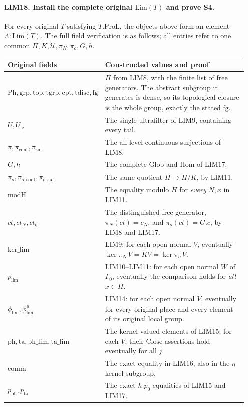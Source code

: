 \paragraph{LIM18. Install the complete original \(\mathrm{Lim}(T)\) and prove S4.}
\label{claim:LIM18}
For every original \(T\) satisfying \(T.\mathrm{ProL}\), the
objects above form an element \(\Lambda:\mathrm{Lim}(T)\).
The full field verification is as follows; all entries refer to
one common \(\Pi,K,\mathcal U,\pi_N,\pi_o,G,h\).

\begin{longtable}{@{}p{0.34\linewidth}p{0.61\linewidth}@{}}
\toprule
Original fields & Constructed values and proof \\
\midrule
\endhead
\(\mathrm{Ph},\mathrm{grp},\mathrm{top},\mathrm{tgrp},
  \mathrm{cpt},\mathrm{tdisc},\mathrm{fg}\)
& \(\Pi\) from LIM8, with the finite list of free generators.
  The abstract subgroup it generates is dense, so its topological
  closure is the whole group, exactly the stated \(\mathrm{fg}\). \\
\(U,U_{\mathrm{le}}\)
& The single ultrafilter of LIM9, containing every tail. \\
\(\pi,\pi_{\mathrm{cont}},\pi_{\mathrm{surj}}\)
& The all-level continuous surjections of LIM8. \\
\(G,h\)
& The complete \(\mathrm{Glob}\) and \(\mathrm{Hom}\) of LIM17. \\
\(\pi_o,\pi_{o,\mathrm{cont}},\pi_{o,\mathrm{surj}}\)
& The same quotient \(\Pi\to\Pi/K\), by LIM11. \\
\(\mathrm{modH}\)
& The equality modulo \(H\) for \emph{every} \(N,x\) in LIM11. \\
\(ct,ct_N,ct_o\)
& The distinguished free generator, \(\pi_N(ct)=c_N\),
  and \(\pi_o(ct)=G.c\), by LIM8 and LIM17. \\
\(\mathrm{ker\_lim}\)
& LIM9: for each open normal \(V\), eventually
  \(\ker\pi_N\,V=K V=\ker\pi_o\,V\). \\
\(p_{\mathrm{lim}}\)
& LIM10--LIM11: for each open normal \(W\) of \(\Gamma_0\),
  eventually the comparison holds for \emph{all} \(x\in\Pi\). \\
\(\phi_{\mathrm{lim}},\phi^u_{\mathrm{lim}}\)
& LIM14: for each open normal \(V\), eventually for every
  original place and every element of its original local group. \\
\(\mathrm{ph},\mathrm{ta},\mathrm{ph\_lim},\mathrm{ta\_lim}\)
& The kernel-valued elements of LIM15; for each \(V\), their
  \(\mathrm{Close}\) assertions hold eventually for all \(j\). \\
\(\mathrm{comm}\)
& The exact equality in LIM16, also in the \(\eta\)-kernel subgroup. \\
\(p_{\mathrm{ph}},p_{\mathrm{ta}}\)
& The exact \(h.p_0\)-equalities of LIM15 and LIM17. \\
\bottomrule
\end{longtable}

